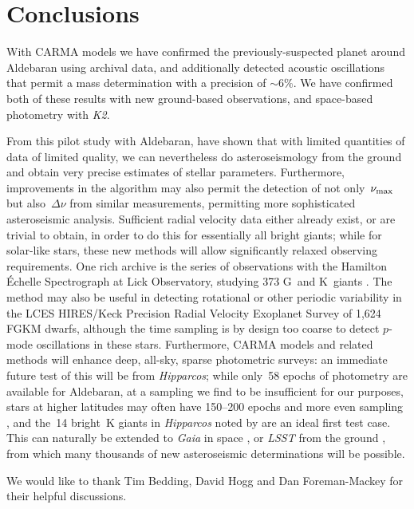\documentclass[modern]{aastex61}
\newcommand{\numax}{\mbox{$\nu_{\rm max}$}\xspace}
\newcommand{\Dnu}{\mbox{$\Delta \nu$}\xspace}
\newcommand{\hipparcos}{\emph{Hipparcos}\xspace}
\newcommand{\ktwo}{\emph{K2}\xspace}
\begin{document}
\section{Conclusions}

With CARMA models we have confirmed the previously-suspected planet around Aldebaran using archival data, and additionally detected acoustic oscillations that permit a mass determination with a precision of $\sim 6\%$. We have confirmed both of these results with new ground-based observations, and space-based photometry with \ktwo.

From this pilot study with Aldebaran, have shown that with limited quantities of data of limited quality, we can nevertheless do asteroseismology from the ground and obtain very precise estimates of stellar parameters. Furthermore, improvements in the algorithm may also permit the detection of not only~\numax but also~\Dnu from similar measurements, permitting more sophisticated asteroseismic analysis. Sufficient radial velocity data either already exist, or are trivial to obtain, in order to do this for essentially all bright giants; while for solar-like stars, these new methods will allow significantly relaxed observing requirements. One rich archive is the series of observations with the Hamilton \'{E}chelle Spectrograph at Lick Observatory, studying 373 G~and K~giants \citep[e.g.][]{frink2001,hekker2006,ortiz2016}. The method may also be useful in detecting rotational or other periodic variability in the LCES HIRES/Keck Precision Radial Velocity Exoplanet Survey \citep{butler17} of 1,624 FGKM dwarfs, although the time sampling is by design too coarse to detect $p$-mode oscillations in these stars. Furthermore, CARMA models and related methods will enhance deep, all-sky, sparse photometric surveys: an immediate future test of this will be from \hipparcos; while only~58 epochs of photometry are available for Aldebaran, at a sampling we find to be insufficient for our purposes, stars at higher latitudes may often have 150--200 epochs and more even sampling \citep{hipparcos_phot}, and the~14 bright~K giants in \hipparcos noted by \citet{bedding2000} are an ideal first test case. This can naturally be extended to \emph{Gaia} in space \citep{gaia}, or \emph{LSST} from the ground \citep{dmt,lsst,lsstbook}, from which many thousands of new asteroseismic determinations will be possible.

\acknowledgments

We would like to thank Tim Bedding, David Hogg and Dan Foreman-Mackey for their helpful discussions.
\end{document}
